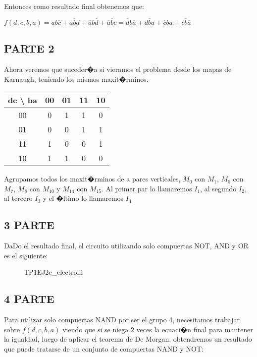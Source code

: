 Entonces como resultado final obtenemos que:

$f(d,c,b,a)=ab\overline{c}+a\overline{b}d+\overline{a}b\overline{d}+\overline{a}\overline{b}c=\overline{d}b\overline{a}+d\overline{b}a+\overline{c}ba+c\overline{b}\overline{a}$

\subsection*{PARTE 2}

Ahora veremos que suceder�a si vieramos el problema desde los mapas
de Karnaugh, teniendo los mismos maxit�rminos.

\begin{tabular}{|c|c|c|c|c|}
\hline 
dc \textbackslash{} ba & 00 & 01 & 11 & 10\tabularnewline
\hline 
00 & 0 & 1 & 1 & 0\tabularnewline
\hline 
01 & 0 & 0 & 1 & 1\tabularnewline
\hline 
11 & 1 & 0 & 0 & 1\tabularnewline
\hline 
10 & 1 & 1 & 0 & 0\tabularnewline
\hline 
\end{tabular}

Agrupamos todos los maxit�rminos de a pares verticales, $M_{0}$ con
$M_{1}$, $M_{5}$ con $M_{7}$, $M_{8}$ con $M_{10}$ y $M_{14}$
con $M_{15}$. Al primer par lo llamaremos $I_{1}$, al segundo $I_{2}$,
al tercero $I_{3}$ y el �ltimo lo llamaremos $I_{4}$

\subsection*{3 PARTE}

%
DaDo el resultado final, el circuito utilizando solo compuertas NOT,
AND y OR es el siguiente:

\begin{figure}
\caption{\foreignlanguage{english}{TP1EJ2c\_electroiii}}

%
%
\end{figure}

%

\subsection*{4 PARTE}

%
Para utilizar solo compuertas NAND por ser el grupo 4, necesitamos
trabajar sobre $f(d,c,b,a)$ viendo que si se niega 2 veces la ecuaci�n
final para mantener la igualdad, luego de aplicar el teorema de De
Morgan, obtendremos un resultado que puede tratarse de un conjunto
de compuertas NAND y NOT:


